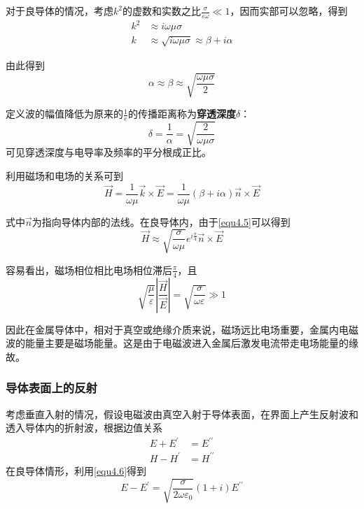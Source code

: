 \documentclass[UTF8]{ctexart}
\begin{document}
    对于良导体的情况，考虑$k^2$的虚数和实数之比$\frac{\sigma}{\varepsilon \omega} \ll 1$，因而实部可以忽略，得到
    \begin{equation}
        \begin{aligned}
            k^2 &\approx i \omega \mu \sigma \\
            k &\approx \sqrt{i \omega \mu \sigma} \approx \beta + i \alpha
        \end{aligned}
    \end{equation}

\noindent 由此得到
\begin{equation}
    \alpha \approx \beta \approx \sqrt{\frac{\omega \mu \sigma}{2}} \label{equ4.5}
\end{equation}

\noindent 定义波的幅值降低为原来的$\frac{1}{e}$的传播距离称为\textbf{穿透深度}$\delta$：
\begin{equation}
    \delta = \frac{1}{\alpha} = \sqrt{\frac{2}{\omega \mu \sigma}}
\end{equation}
\noindent 可见穿透深度与电导率及频率的平分根成正比。

    利用磁场和电场的关系可到
    \begin{equation}
        \vec{H} = \frac{1}{\omega \mu} \vec{k} \times \vec{E} = \frac{1}{\omega \mu}(\beta + i \alpha) \vec{n} \times \vec{E} \label{equ4.6}
    \end{equation}

\noindent 式中$\vec{n}$为指向导体内部的法线。在良导体内，由于\autoref{equ4.5}可以得到
\begin{equation}
    \vec{H} \approx \sqrt{\frac{\sigma}{\omega \mu}} e^{i \frac{\pi}{4}} \vec{n} \times \vec{E}
\end{equation}

\noindent 容易看出，磁场相位相比电场相位滞后$\frac{\pi}{4}$，且
\begin{equation}
    \sqrt{\frac{\mu}{\varepsilon}} \left|\frac{\vec{H}}{\vec{E}}\right| = \sqrt{\frac{\sigma}{\omega \varepsilon}} \gg 1
\end{equation}

\noindent 因此在金属导体中，相对于真空或绝缘介质来说，磁场远比电场重要，金属内电磁波的能量主要是磁场能量。这是由于电磁波进入金属后激发电流带走电场能量的缘故。

    \subsubsection{导体表面上的反射}
    考虑垂直入射的情况，假设电磁波由真空入射于导体表面，在界面上产生反射波和透入导体内的折射波，根据边值关系
    \begin{equation}
        \begin{aligned}
            E + E^{\prime} &= E^{\prime \prime} \\
            H - H^{\prime}&= H^{\prime \prime}
        \end{aligned}
    \end{equation}
\noindent 在良导体情形，利用\autoref{equ4.6}得到
\begin{equation}
    E - E^{\prime} = \sqrt{\frac{\sigma}{2 \omega \varepsilon_0}}(1+i) E^{\prime \prime}
\end{equation}
\end{document}
